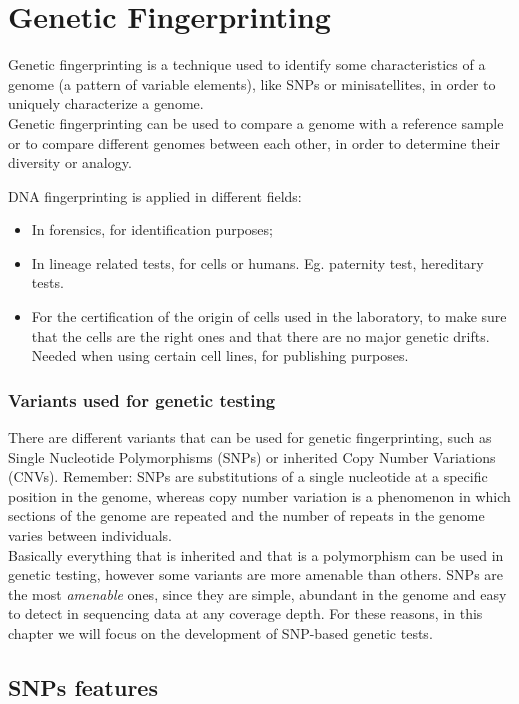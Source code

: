 \graphicspath{{chapters/notes/03/images}}
\chapter{Genetic Fingerprinting}
Genetic fingerprinting is a technique used to identify some characteristics of a genome (a pattern of variable elements), like SNPs or minisatellites, in order to uniquely characterize a genome.\\
Genetic fingerprinting can be used to compare a genome with a reference sample or to compare different genomes between each other, in order to determine their diversity or analogy.

DNA fingerprinting is applied in different fields:

\begin{itemize}
	\item In forensics, for identification purposes;
	\item In lineage related tests, for cells or humans. Eg. paternity test, hereditary tests.
	\item For the certification of the origin of cells used in the laboratory, to make sure that the cells are the right ones and that there are no major genetic drifts. Needed when using certain cell lines, for publishing purposes.
\end{itemize}


\subsection{Variants used for genetic testing}
There are different variants that can be used for genetic fingerprinting, such as Single Nucleotide Polymorphisms (SNPs) or inherited Copy Number Variations (CNVs).
Remember: SNPs are substitutions of a single nucleotide at a specific position in the genome, whereas copy number variation is a phenomenon in which sections of the genome are repeated and the number of repeats in the genome varies between individuals.\\
Basically everything that is inherited and that is a polymorphism can be used in genetic testing, however some variants are more amenable than others.
SNPs are the most \textit{amenable} ones, since they are simple, abundant in the genome and easy to detect in sequencing data at any coverage depth. For these reasons, in this chapter we will focus on the development of SNP-based genetic tests.

\section{SNPs features}

